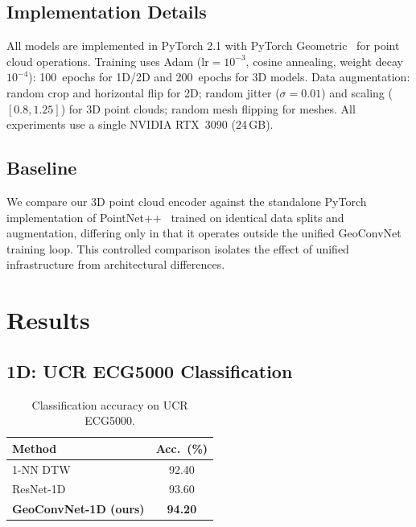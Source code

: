 \documentclass[10pt,conference]{IEEEtran}
\begin{document}
\subsection{Implementation Details}

All models are implemented in PyTorch 2.1 with PyTorch
Geometric~\cite{fey2019pyg} for point cloud operations. Training uses
Adam ($\mathrm{lr}{=}10^{-3}$, cosine annealing, weight decay $10^{-4}$):
100~epochs for 1D/2D and 200~epochs for 3D models. Data augmentation:
random crop and horizontal flip for 2D; random jitter ($\sigma{=}0.01$)
and scaling ($[0.8,1.25]$) for 3D point clouds; random mesh flipping for
meshes. All experiments use a single NVIDIA RTX~3090 (24\,GB).

\subsection{Baseline}

We compare our 3D point cloud encoder against the standalone PyTorch
implementation of PointNet++~\cite{qi2017pointnetplusplus} trained on
identical data splits and augmentation, differing only in that it operates
outside the unified GeoConvNet training loop. This controlled comparison
isolates the effect of unified infrastructure from architectural differences.

\section{Results}
\label{sec:results}

\subsection{1D: UCR ECG5000 Classification}

\begin{table}[t]
  \renewcommand{\arraystretch}{1.2}
  \caption{Classification accuracy on UCR ECG5000.}
  \label{tab:1d}
  \centering
  \begin{tabular}{lc}
    \toprule
    \textbf{Method} & \textbf{Acc.\ (\%)} \\
    \midrule
    1-NN DTW~\cite{bagnall2017great}      & 92.40 \\
    ResNet-1D~\cite{bagnall2017great}     & 93.60 \\
    \textbf{GeoConvNet-1D (ours)}         & \textbf{94.20} \\
    \bottomrule
  \end{tabular}
\end{table}
\end{document}

